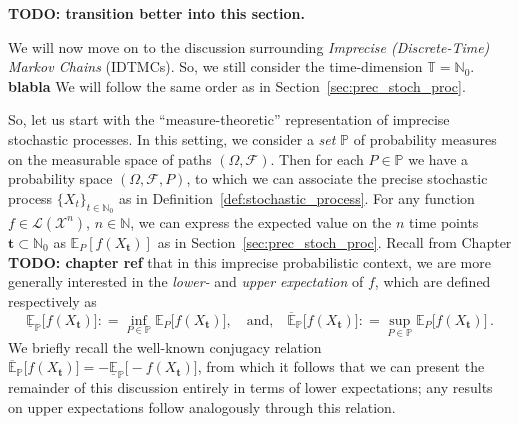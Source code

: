\documentclass[graybox]{svmult}
\newcommand{\nats}{\mathbb{N}}
\newcommand{\natswith}{\nats_{0}}
\newcommand{\states}{\mathcal{X}}
\newcommand{\gambles}{\mathcal{L}}
\newcommand{\coloneqq}{:\!=}
\newcommand{\timedim}{\mathbb{T}}
\begin{document}
{\bf TODO: transition better into this section. }

We will now move on to the discussion surrounding \emph{Imprecise (Discrete-Time) Markov Chains} (IDTMCs). So, we still consider the time-dimension $\timedim=\natswith$. {\bf blabla} We will follow the same order as in Section~\ref{sec:prec_stoch_proc}. 

So, let us start with the ``measure-theoretic'' representation of imprecise stochastic processes. In this setting, we consider a \emph{set} $\mathbb{P}$ of probability measures on the measurable space of paths $(\Omega,\mathcal{F})$. Then for each $P\in\mathbb{P}$ we have a probability space $(\Omega,\mathcal{F},P)$, to which we can associate the precise stochastic process $\{X_t\}_{t\in\natswith}$ as in Definition~\ref{def:stochastic_process}. For any function $f\in\gambles(\states^n)$, $n\in\nats$, we can express the expected value on the $n$ time points $\mathbf{t}\subset\natswith$ as $\mathbb{E}_P[f(X_\mathbf{t})]$ as in Section~\ref{sec:prec_stoch_proc}. Recall from Chapter {\bf TODO: chapter ref} that in this imprecise probabilistic context, we are more generally interested in the \emph{lower-} and \emph{upper expectation} of $f$, which are defined respectively as
\begin{equation*}
\underline{\mathbb{E}}_\mathbb{P}\bigl[f(X_\mathbf{t})\bigr] \coloneqq \inf_{P\in\mathbb{P}} \mathbb{E}_P\bigl[f(X_\mathbf{t})\bigr],\quad\text{and,}\quad \overline{\mathbb{E}}_\mathbb{P}\bigl[f(X_\mathbf{t})\bigr] \coloneqq \sup_{P\in\mathbb{P}} \mathbb{E}_P\bigl[f(X_\mathbf{t})\bigr]\,.
\end{equation*}
We briefly recall the well-known conjugacy relation $\overline{\mathbb{E}}_\mathbb{P}\bigl[f(X_\mathbf{t})\bigr]=-\underline{\mathbb{E}}_\mathbb{P}\bigl[-f(X_\mathbf{t})\bigr]$, from which it follows that we can present the remainder of this discussion entirely in terms of lower expectations; any results on upper expectations follow analogously through this relation.
\end{document}
